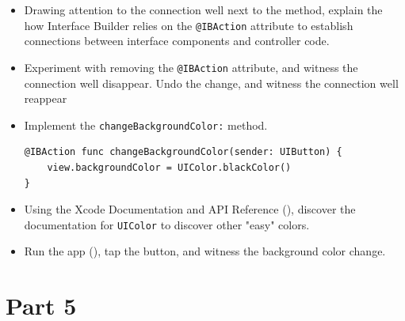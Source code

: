 \documentclass[a4paper,11pt]{scrartcl}
\begin{document}
\begin{itemize}
\begin{lstlisting}
}
\end{lstlisting}
\item Drawing attention to the connection well next to the method, explain the how Interface Builder relies on the \texttt{@IBAction} attribute to establish connections between interface components and controller code.
\item Experiment with removing the \texttt{@IBAction} attribute, and witness the connection well disappear. Undo the change, and witness the connection well reappear 
\item Implement the \texttt{changeBackgroundColor:} method.
\begin{lstlisting}
@IBAction func changeBackgroundColor(sender: UIButton) {
	view.backgroundColor = UIColor.blackColor()
}
\end{lstlisting}
\item Using the Xcode Documentation and API Reference (), discover the documentation for \texttt{UIColor} to discover other "easy" colors.
\item Run the app (), tap the button, and witness the background color change.
\end{itemize}

\section*{Part 5}
\end{document}
